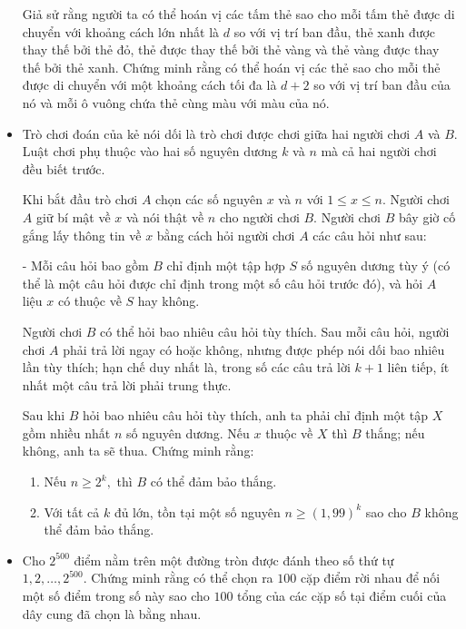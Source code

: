 \documentclass[11pt]{scrartcl}
\begin{document}
\begin{itemize}[label=, leftmargin=0em, itemsep=-0em]
\begin{btvn}
        
        Giả sử rằng người ta có thể hoán vị các tấm thẻ sao cho mỗi tấm thẻ được di chuyển với khoảng cách lớn nhất là $d$ so với vị trí ban đầu, thẻ xanh được thay thế bởi thẻ đỏ, thẻ được thay thế bởi thẻ vàng và thẻ vàng được thay thế bởi thẻ xanh. Chứng minh rằng có thể hoán vị các thẻ sao cho mỗi thẻ được di chuyển với một khoảng cách tối đa là $d + 2$ so với vị trí ban đầu của nó và mỗi ô vuông chứa thẻ cùng màu với màu của nó.
    \end{btvn}

    \item \begin{btvn}
        Trò chơi đoán của kẻ nói dối là trò chơi được chơi giữa hai người chơi $A$ và $B$. Luật chơi phụ thuộc vào hai số nguyên dương $k$ và $n$ mà cả hai người chơi đều biết trước.
    
        Khi bắt đầu trò chơi $A$ chọn các số nguyên $x$ và $n$ với $1 \le x \le n.$ Người chơi $A$ giữ bí mật về $x$ và nói thật về $n$ cho người chơi $B$. Người chơi $B$ bây giờ cố gắng lấy thông tin về $x$ bằng cách hỏi người chơi $A$ các câu hỏi như sau: 
    
        - Mỗi câu hỏi bao gồm $B$ chỉ định một tập hợp $S$ số nguyên dương tùy ý (có thể là một câu hỏi được chỉ định trong một số câu hỏi trước đó), và hỏi $A$ liệu $x$ có thuộc về $S$ hay không. 
            
        Người chơi $B$ có thể hỏi bao nhiêu câu hỏi tùy thích. Sau mỗi câu hỏi, người chơi $A$ phải trả lời ngay có hoặc không, nhưng được phép nói dối bao nhiêu lần tùy thích; hạn chế duy nhất là, trong số các câu trả lời $k+1$ liên tiếp, ít nhất một câu trả lời phải trung thực.
            
        Sau khi $B$ hỏi bao nhiêu câu hỏi tùy thích, anh ta phải chỉ định một tập $X$ gồm nhiều nhất $n$ số nguyên dương. Nếu $x$ thuộc về $X$ thì $B$ thắng; nếu không, anh ta sẽ thua. Chứng minh rằng:
        \begin{enumerate}[label=(\alph*)]
            \item Nếu $n \ge 2^k,$ thì $B$ có thể đảm bảo thắng.
            \item Với tất cả $k$ đủ lớn, tồn tại một số nguyên $n \ge (1,99)^k$ sao cho $B$ không thể đảm bảo thắng.
        \end{enumerate}
    \end{btvn}


    \item \begin{btvn}
        Cho $2^{500}$ điểm nằm trên một đường tròn được đánh theo số thứ tự $1,2,\dots,2^{500}$. Chứng minh rằng có thể chọn ra $100$ cặp điểm rời nhau để nối một số điểm trong số này sao cho $100$ tổng của các cặp số tại điểm cuối của dây cung đã chọn là bằng nhau.
    \end{btvn}


\end{itemize}
\end{document}
